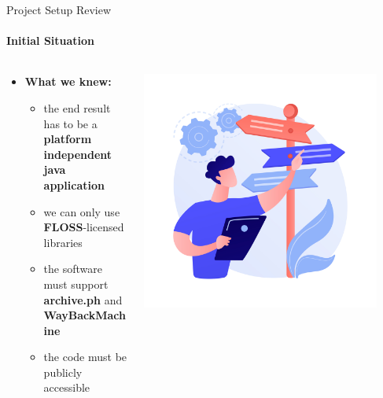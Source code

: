 \documentclass[
ngerman,%
authorontitle=true,
]{bfhbeamer}
\begin{document}
	\begin{frame}{Project Setup Review}
		\framesubtitle{Initial Situation}
		\begin{columns} %
			\begin{column}{0.7\textwidth} %
				\begin{itemize}
					\item \textbf{What we knew:}
					\begin{itemize}
						\item the end result has to be a \textbf{platform independent java application}
						\item we can only use \textbf{FLOSS}-licensed libraries 
						\item the software must support \textbf{archive.ph} and \textbf{WayBackMachine}
						\item the code must be publicly accessible
					\end{itemize}
					
				\end{itemize}
			\end{column}
			\begin{column}{0.3\textwidth} %
				\begin{center}
					\includegraphics[width=0.9\textwidth]{pictures/final_presentation/initial_situation.jpg}
				\end{center}
			\end{column}
		\end{columns}
	\end{frame}
	
\end{document}

